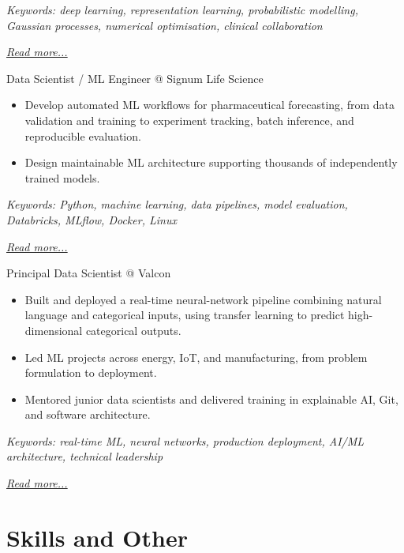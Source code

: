 \documentclass[11pt,a4paper]{moderncv}
\begin{document}
{\footnotesize\textit{Keywords: deep learning, representation learning, probabilistic modelling, Gaussian processes, numerical optimisation, clinical collaboration}}

\hfill{\small{\textit{\hyperref[sec:raysearch]{Read more...}}}}

\large{Data Scientist / ML Engineer @ Signum Life Science}
\normalsize
\begin{itemize}
    \item Develop automated ML workflows for pharmaceutical forecasting, from data validation and training to experiment tracking, batch inference, and reproducible evaluation.
    \item Design maintainable ML architecture supporting thousands of independently trained models.
\end{itemize}

{\footnotesize\textit{Keywords: Python, machine learning, data pipelines, model evaluation, Databricks, MLflow, Docker, Linux}}

\hfill{\small{\textit{\hyperref[sec:signum]{Read more...}}}}

\large{Principal Data Scientist @ Valcon}
\normalsize
\begin{itemize}
    \item Built and deployed a real-time neural-network pipeline combining natural language and categorical inputs, using transfer learning to predict high-dimensional categorical outputs.
    \item Led ML projects across energy, IoT, and manufacturing, from problem formulation to deployment.
    \item Mentored junior data scientists and delivered training in explainable AI, Git, and software architecture.
\end{itemize}

{\footnotesize\textit{Keywords: real-time ML, neural networks, production deployment, AI/ML architecture, technical leadership}}

\hfill{\small{\textit{\hyperref[sec:valcon]{Read more...}}}}


\section{Skills and Other}

\normalsize
{}
\end{document}
